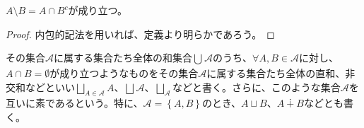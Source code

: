 \documentclass[a4paper]{jsarticle}
\begin{document}
\begin{thm}
\label{1.2.1.9}
$A \setminus B = A \cap B^{c}$が成り立つ。
\end{thm}
\begin{proof}
内包的記法を用いれば、定義より明らかであろう。
\end{proof}
\begin{dfn}
その集合$\mathcal{A}$に属する集合たち全体の和集合$\bigcup_{} \mathcal{A}$のうち、$\forall A,B \in \mathcal{A}$に対し、$A \cap B = \emptyset$が成り立つようなものをその集合$\mathcal{A}$に属する集合たち全体の直和、非交和などといい$\bigsqcup_{A \in \mathcal{A}} A$、$\bigsqcup_{} \mathcal{A}$、$\bigsqcup_{\mathcal{A}} $などと書く。さらに、このような集合$\mathcal{A}$を互いに素であるという。特に、$\mathcal{A} =\left\{ A,B \right\}$のとき、$A \sqcup B$、$A \dotplus B$などとも書く。
\end{dfn}
\end{document}
